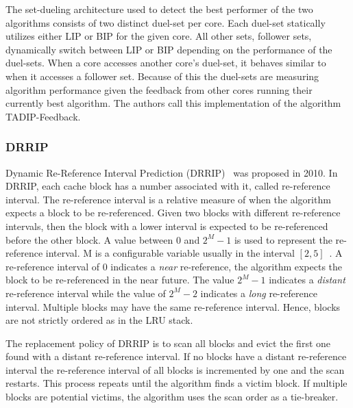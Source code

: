 The set-dueling architecture used to detect the best performer of the two algorithms consists of two distinct duel-set per core.
Each duel-set statically utilizes either LIP or BIP for the given core.
All other sets, follower sets, dynamically switch between LIP or BIP depending on the performance of the duel-sets.
When a core accesses another core's duel-set, it behaves similar to when it accesses a follower set.
Because of this the duel-sets are measuring algorithm performance given the feedback from other cores running their currently best algorithm.
The authors call this implementation of the algorithm TADIP-Feedback.

\subsubsection{DRRIP}

Dynamic Re-Reference Interval Prediction (DRRIP)~\cite{Jaleel2010} was proposed in 2010.
In DRRIP, each cache block has a number associated with it, called re-reference interval.
The re-reference interval is a relative measure of when the algorithm expects a block to be re-referenced.
Given two blocks with different re-reference intervals, then the block with a lower interval is expected to be re-referenced before the other block.
A value between 0 and $2^M - 1$ is used to represent the re-reference interval.
M is a configurable variable usually in the interval $[2, 5]$~\cite{Jaleel2010}.
A re-reference interval of 0 indicates a \textit{near} re-reference, the algorithm expects the block to be re-referenced in the near future.
The value $2^M - 1$ indicates a \textit{distant} re-reference interval while the value of $2^M - 2$ indicates a \textit{long} re-reference interval.
Multiple blocks may have the same re-reference interval. 
Hence, blocks are not strictly ordered as in the LRU stack.

The replacement policy of DRRIP is to scan all blocks and evict the first one found with a distant re-reference interval.
If no blocks have a distant re-reference interval the re-reference interval of all blocks is incremented by one and the scan restarts.
This process repeats until the algorithm finds a victim block.
If multiple blocks are potential victims, the algorithm uses the scan order as a tie-breaker.

